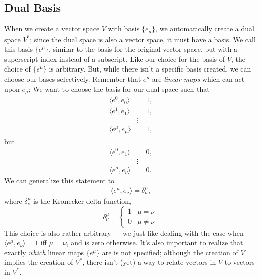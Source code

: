 \subsection{Dual Basis}
When we create a vector space $V$ with basis $\{e_\mu\}$, we automatically create a dual space $V^*$; since the dual space is also a vector space, it must have a basis. We call this basis $\{e^\mu\}$, similar to the basis for the original vector space, but with a superscript index instead of a subscript.
Like our choice for the basis of $V$, the choice of $\{e^\mu\}$ is arbitrary.
But, while there isn't a specific basis created, we can choose our bases selectively.
Remember that $e^\mu$ are \emph{linear maps} which can act upon $e_\mu$;
We want to choose the basis for our dual space such that
\begin{align*}
    \langle e^0, e_0 \rangle &= 1, \\
    \langle e^1, e_1 \rangle &= 1, \\
    &\vdots \\
    \langle e^\mu, e_\mu \rangle &= 1,
\end{align*}
but 
\begin{align*}
    \langle e^0, e_1 \rangle &= 0, \\
    &\vdots \\
    \langle e^\mu, e_\nu \rangle &= 0.
\end{align*}
We can generalize this statement to
\begin{align*}
    \langle e^\mu, e_\nu \rangle = \delta^\mu_\nu,
\end{align*}
where $\delta^\mu_\nu$ is the Kronecker delta function,
\[
    \delta^\mu_\nu =
    \begin{cases}
        1 & \mu = \nu \\
        0 & \mu \not= \nu
    \end{cases}.
\]
This choice is also rather arbitrary --- we just like dealing with the case when $\langle e^\mu, e_\nu \rangle = 1$ iff $\mu = \nu$, and is zero otherwise. It's also important to realize that exactly \emph{which} linear maps $\{e^\mu\}$ are is not specified; although the creation of $V$ implies the creation of $V^*$, there isn't (yet) a way to relate vectors in $V$ to vectors in $V^*$.

